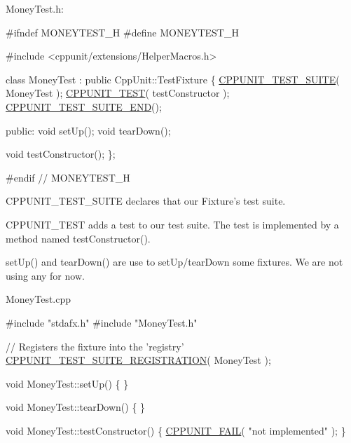 {\ttfamily Money\+Test.\+h\+:} 
\begin{DoxyCode}
\textcolor{preprocessor}{#ifndef MONEYTEST\_H}
\textcolor{preprocessor}{#define MONEYTEST\_H}

\textcolor{preprocessor}{#include <cppunit/extensions/HelperMacros.h>}

\textcolor{keyword}{class }MoneyTest : \textcolor{keyword}{public} CppUnit::TestFixture
\{
  \hyperlink{group___writing_test_fixture_gabe1e12200f40d6f25d60c1783c99da81}{CPPUNIT\_TEST\_SUITE}( MoneyTest );
  \hyperlink{group___writing_test_fixture_gaac9b03d898b207e1daf2f93867935a96}{CPPUNIT\_TEST}( testConstructor );
  \hyperlink{group___writing_test_fixture_ga601b2e1d525f3947b216e28c625abcb1}{CPPUNIT\_TEST\_SUITE\_END}();

\textcolor{keyword}{public}:
  \textcolor{keywordtype}{void} setUp();
  \textcolor{keywordtype}{void} tearDown();

  \textcolor{keywordtype}{void} testConstructor();
\};

\textcolor{preprocessor}{#endif  // MONEYTEST\_H}
\end{DoxyCode}



\begin{DoxyItemize}
\item C\+P\+P\+U\+N\+I\+T\+\_\+\+T\+E\+S\+T\+\_\+\+S\+U\+I\+T\+E declares that our Fixture's test suite.
\item C\+P\+P\+U\+N\+I\+T\+\_\+\+T\+E\+S\+T adds a test to our test suite. The test is implemented by a method named test\+Constructor().
\item set\+Up() and tear\+Down() are use to set\+Up/tear\+Down some fixtures. We are not using any for now.
\end{DoxyItemize}

{\ttfamily Money\+Test.\+cpp} 
\begin{DoxyCode}
\textcolor{preprocessor}{#include "stdafx.h"}
\textcolor{preprocessor}{#include "MoneyTest.h"}

\textcolor{comment}{// Registers the fixture into the 'registry'}
\hyperlink{group___creating_test_suite_ga2f4071eec88d1e306665ada0f2dd80e4}{CPPUNIT\_TEST\_SUITE\_REGISTRATION}( MoneyTest );


\textcolor{keywordtype}{void} 
MoneyTest::setUp()
\{
\}


\textcolor{keywordtype}{void} 
MoneyTest::tearDown()
\{
\}


\textcolor{keywordtype}{void} 
MoneyTest::testConstructor()
\{
  \hyperlink{group___assertions_ga26aaaa22505b7a7b4978f0401a86f12a}{CPPUNIT\_FAIL}( \textcolor{stringliteral}{"not implemented"} );
\}
\end{DoxyCode}


